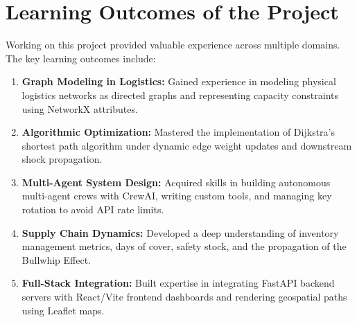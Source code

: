\section{Learning Outcomes of the Project}
Working on this project provided valuable experience across multiple domains. The key learning outcomes include:
\begin{enumerate}
    \item \textbf{Graph Modeling in Logistics:} Gained experience in modeling physical logistics networks as directed graphs and representing capacity constraints using NetworkX attributes.
    \item \textbf{Algorithmic Optimization:} Mastered the implementation of Dijkstra's shortest path algorithm under dynamic edge weight updates and downstream shock propagation.
    \item \textbf{Multi-Agent System Design:} Acquired skills in building autonomous multi-agent crews with CrewAI, writing custom tools, and managing key rotation to avoid API rate limits.
    \item \textbf{Supply Chain Dynamics:} Developed a deep understanding of inventory management metrics, days of cover, safety stock, and the propagation of the Bullwhip Effect.
    \item \textbf{Full-Stack Integration:} Built expertise in integrating FastAPI backend servers with React/Vite frontend dashboards and rendering geospatial paths using Leaflet maps.
\end{enumerate}
